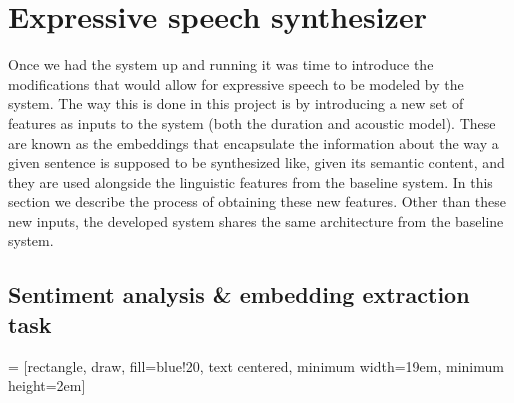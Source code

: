 \chapter{Expressive speech synthesizer}

Once we had the system up and running it was time to introduce the modifications that would allow for expressive speech to be modeled by the system. The way this is done in this project is by introducing a new set of features as inputs to the system (both the duration and acoustic model). These are known as the embeddings that encapsulate the information about the way a given sentence is supposed to be synthesized like, given its semantic content, and they are used alongside the linguistic features from the baseline system. In this section we describe the process of obtaining these new features. Other than these new inputs, the developed system shares the same architecture from the baseline system.

\section{Sentiment analysis \& embedding extraction task} \label{sec:sa}

 = [rectangle, draw, fill=blue!20, text centered, minimum width=19em, minimum height=2em]

